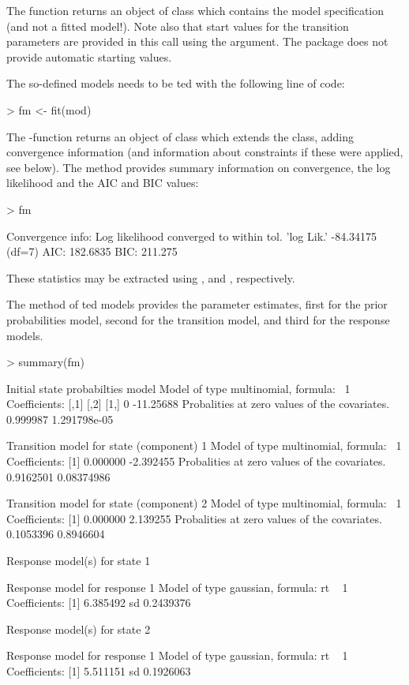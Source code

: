 \documentclass[article]{jss}
\begin{document}
The  function returns an object of class 
which contains the model specification (and not a fitted model!).
Note also that start values for the transition parameters are provided
in this call using the  argument. The package does not 
provide automatic starting values. 

The so-defined models needs to be ted with the following
line of code:
\begin{CodeChunk}
\begin{CodeInput}
> fm <- fit(mod)
\end{CodeInput}
\end{CodeChunk}

The -function returns an object of class
 which extends the  class, adding
convergence information (and information about constraints if these
were applied, see below).  The  method provides summary
information on convergence, the log likelihood and the AIC and BIC
values:
\begin{CodeChunk}
\begin{CodeInput}
> fm
\end{CodeInput}
\begin{CodeOutput}
Convergence info: Log likelihood converged to within tol. 
'log Lik.' -84.34175 (df=7)
AIC:  182.6835 
BIC:  211.275 
\end{CodeOutput}
\end{CodeChunk}
These statistics may be extracted using ,
 and , respectively.

The  method of ted models provides the parameter
estimates, first for the prior probabilities model, second for the
transition model, and third for the response models.

\begin{CodeChunk}
\begin{CodeInput}
> summary(fm)
\end{CodeInput}
\begin{CodeOutput}
Initial state probabilties model 
Model of type multinomial, formula: ~1
Coefficients: 
     [,1]      [,2]
[1,]    0 -11.25688
Probalities at zero values of the covariates.
0.999987 1.291798e-05 

Transition model for state (component) 1 
Model of type multinomial, formula: ~1
Coefficients: 
[1]  0.000000 -2.392455
Probalities at zero values of the covariates.
0.9162501 0.08374986 

Transition model for state (component) 2 
Model of type multinomial, formula: ~1
Coefficients: 
[1] 0.000000 2.139255
Probalities at zero values of the covariates.
0.1053396 0.8946604 

Response model(s) for state 1 

Response model for response 1 
Model of type gaussian, formula: rt ~ 1
Coefficients: 
[1] 6.385492
sd  0.2439376 

Response model(s) for state 2 

Response model for response 1 
Model of type gaussian, formula: rt ~ 1
Coefficients: 
[1] 5.511151
sd  0.1926063 
\end{CodeOutput}
\end{CodeChunk}
\end{document}

